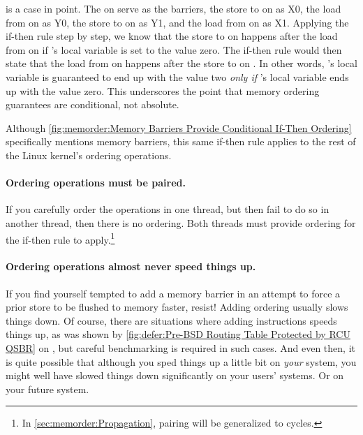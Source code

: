 \begin{fcvref}
is a case in point.
The  on  serve as the barriers,
the store to  on  as X0, the load from 
on  as Y0, the store to  on  as Y1,
and the load from  on  as X1.
Applying the if-then rule step by step, we know that the store to
 on  happens after the load from  on  if
's local variable  is set to the value zero.
The if-then rule would then state that the load from  on
 happens after the store to  on .
In other words,
's local variable  is guaranteed
to end up with the value two \emph{only if}
's local variable  ends up with the value zero.
This underscores the point that memory ordering guarantees are
conditional, not absolute.
\end{fcvref}

Although
\cref{fig:memorder:Memory Barriers Provide Conditional If-Then Ordering}
specifically mentions memory barriers, this same if-then rule applies
to the rest of the Linux kernel's ordering operations.

\paragraph{Ordering operations must be paired.}
If you carefully order the operations in one thread, but then fail to do
so in another thread, then there is no ordering.
Both threads must provide ordering for the if-then rule to apply.\footnote{
	In \cref{sec:memorder:Propagation}, pairing will be
	generalized to cycles.}

\paragraph{Ordering operations almost never speed things up.}
If you find yourself tempted to add a memory barrier in an attempt
to force a prior store to be flushed to memory faster, resist!
Adding ordering usually slows things down.
Of course, there are situations where adding instructions speeds things
up, as was shown by
\cref{fig:defer:Pre-BSD Routing Table Protected by RCU QSBR} on
,
but careful benchmarking is required in such cases.
And even then, it is quite possible that although you sped things up
a little bit on \emph{your} system, you might well have slowed things
down significantly on your users' systems.
Or on your future system.

